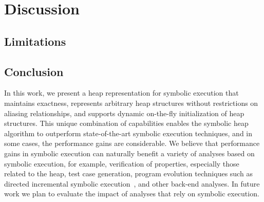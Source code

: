 \section{Discussion}

\subsection{Limitations}

\subsection{Conclusion}

In this work, we present a
heap representation for symbolic execution that maintains exactness,
represents arbitrary heap structures without restrictions on aliasing
relationships, and supports dynamic on-the-fly initialization of heap
structures. This unique combination of capabilities enables the
symbolic heap algorithm to outperform state-of-the-art symbolic
execution techniques, and in some cases, the performance gains are
considerable. We believe that performance gains in symbolic execution
can naturally benefit a variety of analyses based on symbolic
execution, for example, verification of properties, especially those
related to the heap, test case generation, program evolution
techniques such as directed incremental symbolic
execution~\cite{person:pldi2011}, and other back-end analyses. In
future work we plan to evaluate the impact of analyses that rely on
symbolic execution.

